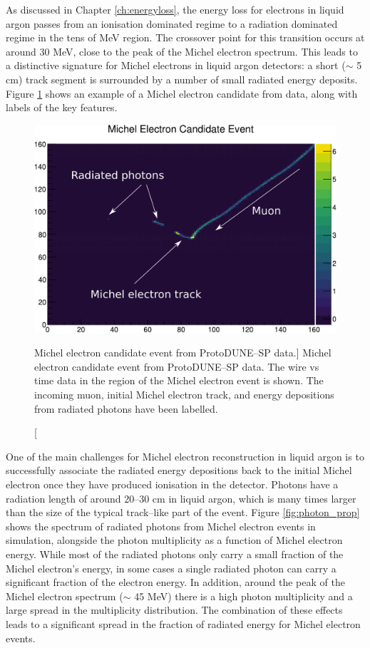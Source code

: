 As discussed in Chapter \ref{ch:energyloss}, the energy loss for electrons in
liquid argon passes from an ionisation dominated regime to a radiation dominated
regime in the tens of MeV region. The crossover point for this transition occurs
at around 30 MeV, close to the peak of the Michel electron spectrum. This
leads to a distinctive signature for Michel electrons in liquid argon 
detectors: a short ($\sim$ 5 cm) track segment is surrounded by a number of 
small radiated energy deposits. Figure \ref{fig:michel_event} shows an example 
of a Michel electron candidate from \protodune{} data, along with labels of 
the key features.

\begin{figure}
	\centering
	\includegraphics[width=\textwidth]{figures/michel_candidate_labelled.pdf}
	\caption
	[Michel electron candidate event from ProtoDUNE--SP data.]
	{Michel electron candidate event from ProtoDUNE--SP data. The wire vs time
	data in the region of the Michel electron event is shown. The incoming muon,
	initial Michel electron track, and energy depositions from radiated photons
	have been labelled.}
	\label{fig:michel_event}
\end{figure}

One of the main challenges for Michel electron reconstruction in liquid argon is
to successfully associate the radiated energy depositions back to the initial
Michel electron once they have produced ionisation in the detector. Photons have
a radiation length of around 20--30 cm in liquid argon, which is many times
larger than the size of the typical track--like part of the event. Figure
\ref{fig:photon_prop} shows the spectrum of radiated photons from Michel
electron events in \protodune{} simulation, alongside the photon multiplicity
as a function of Michel electron energy. While most of the radiated photons
only carry a small fraction of the Michel electron's energy, in some cases a
single radiated photon can carry a significant fraction of the electron
energy. In addition, around the peak of the Michel electron spectrum ($\sim$
45 MeV) there is a high photon multiplicity and a large spread in the
multiplicity distribution. The combination of these effects leads to a
significant spread in the fraction of radiated energy for Michel electron
events.

